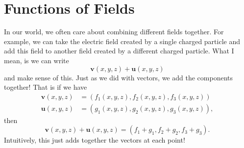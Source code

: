         \section{Functions of Fields}
        In our world, we often care about combining different fields together.  For example, we can take the electric field created by a single charged particle and add this field to another field created by a different charged particle. What I mean, is we can write
        \[
        \mathbf{v}(x,y,z)+\mathbf{u}(x,y,z)
        \]
        and make sense of this.  Just as we did with vectors, we add the components together! That is if we have
        \begin{align*}
        \mathbf{v}(x,y,z)&=(f_1(x,y,z),f_2(x,y,z),f_3(x,y,z))\\ \mathbf{u}(x,y,z)&=(g_1(x,y,z),g_2(x,y,z),g_3(x,y,z)),
        \end{align*}
        then
        \[
        \mathbf{v}(x,y,z)+\mathbf{u}(x,y,z)=(f_1+g_1,f_2+g_2,f_3+g_3).
        \]
        Intuitively, this just adds together the vectors at each point!
        
